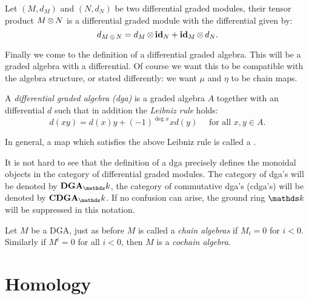 \begin{definition}
	Let $(M, d_M)$ and $(N, d_N)$ be two differential graded modules, their tensor product $M \operatorname*{\otimes} N$ is a differential graded module with the differential given by:
	$$ d_{M \operatorname*{\otimes} N} = d_M \operatorname*{\otimes} \mathbf{id}_N + \mathbf{id}_M \operatorname*{\otimes} d_N. $$
\end{definition}

Finally we come to the definition of a differential graded algebra. This will be a graded algebra with a differential. Of course we want this to be compatible with the algebra structure, or stated differently: we want $\mu$ and $\eta$ to be chain maps.

\begin{definition}
	A \emph{differential graded algebra (dga)} is a graded algebra $A$ together with an differential $d$ such that in addition the \emph{Leibniz rule} holds:
	$$ d(x y) = d(x) y + (-1)^{\deg{x}} x d(y) \quad\text{ for all } x, y \in A. $$
\end{definition}

In general, a map which satisfies the above Leibniz rule is called a .

It is not hard to see that the definition of a dga precisely defines the monoidal objects in the category of differential graded modules. The category of dga's will be denoted by $\DGA_\k$, the category of commutative dga's (cdga's) will be denoted by $\CDGA_\k$. If no confusion can arise, the ground ring $\k$ will be suppressed in this notation.

Let $M$ be a DGA, just as before $M$ is called a \emph{chain algebras} if $M_i = 0$ for $i < 0$. Similarly if $M^i = 0$ for all $i < 0$, then $M$ is a \emph{cochain algebra}.





\section{Homology}

